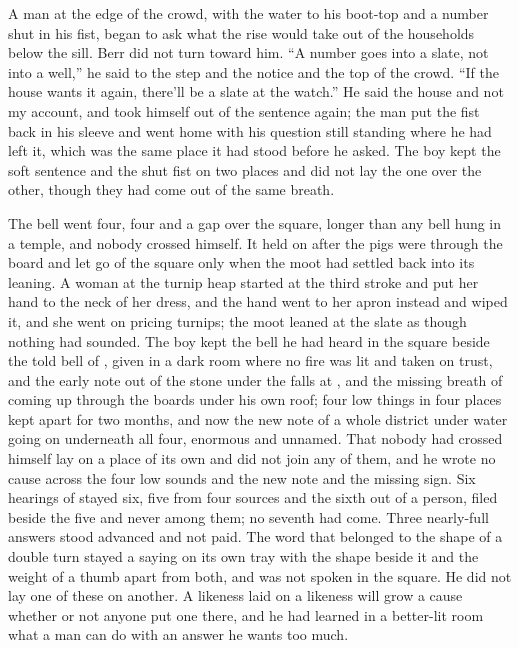 A man at the edge of the crowd, with the water to his boot-top and a number shut in his fist, began to ask what the rise would take out of the households below the sill. Berr did not turn toward him. “A number goes into a slate, not into a well,” he said to the step and the notice and the top of the crowd. “If the house wants it again, there'll be a slate at the watch.” He said the house and not my account, and took himself out of the sentence again; the man put the fist back in his sleeve and went home with his question still standing where he had left it, which was the same place it had stood before he asked. The boy kept the soft sentence and the shut fist on two places and did not lay the one over the other, though they had come out of the same breath.

The bell went four, four and a gap over the square, longer than any bell hung in a temple, and nobody crossed himself. It held on after the pigs were through the board and let go of the square only when the moot had settled back into its leaning. A woman at the turnip heap started at the third stroke and put her hand to the neck of her dress, and the hand went to her apron instead and wiped it, and she went on pricing turnips; the moot leaned at the slate as though nothing had sounded. The boy kept the bell he had heard in the square beside the told bell of , given in a dark room where no fire was lit and taken on trust, and the early note out of the stone under the falls at , and the missing breath of  coming up through the boards under his own roof; four low things in four places kept apart for two months, and now the new note of a whole district under water going on underneath all four, enormous and unnamed. That nobody had crossed himself lay on a place of its own and did not join any of them, and he wrote no cause across the four low sounds and the new note and the missing sign. Six hearings of  stayed six, five from four sources and the sixth out of a person, filed beside the five and never among them; no seventh had come. Three nearly-full answers stood advanced and not paid. The word that belonged to the shape of a double turn stayed a saying on its own tray with the shape beside it and the weight of a thumb apart from both, and was not spoken in the square. He did not lay one of these on another. A likeness laid on a likeness will grow a cause whether or not anyone put one there, and he had learned in a better-lit room what a man can do with an answer he wants too much.

